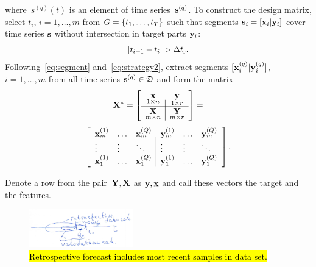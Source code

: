 \documentclass[conference]{IEEEtran}
\begin{document}
where~$s^{(q)}(t)$ is an element of time series~${\mathbf{s}}^{(q)}$. To construct the design matrix, select $t_i$, $i = 1, \dots, m$ from $G = \{t_1, \dots, t_T\}$ such that segments ${\mathbf{s}}_i = [{\mathbf{x}}_i|{\mathbf{y}}_i]$ cover time series ${\mathbf{s}}$
without intersection in target parts  ${\mathbf{y}}_i$:
\begin{equation}\label{eq:strategy2} |t_{i+1} - t_i| > \dtr.
\end{equation}
Following~\eqref{eq:segment} and~\eqref{eq:strategy2}, extract segments $[{\mathbf{x}}^{(q)}_i | {\mathbf{y}}^{(q)}_i]$, $i = 1, \dots, m$ from all time series ${\mathbf{s}}^{(q)} \in {\mathfrak{D}}$ and form the matrix
 \begin{equation}\label{eq:design_matrix}
\bX^*= \left[
\begin{array}{c|c}
\underset{1{\times}n}{\x} & \underset{1{\times}r}{{\by}}  \\
\hline
 \underset{m{\times}n}\bX & \underset{m{\times}r}\bY  \\
 \end{array}
\right] = \end{equation}
\[ \left[
\begin{array}{lll|lll}
{\mathbf{x}}_m^{(1)}  & \dots & {\mathbf{x}}_m^{(Q)} & {\mathbf{y}}_m^{(1)} &  \dots & {\mathbf{y}}_m^{(Q)}   \\
\vdots & \vdots & \ddots & \vdots & \vdots & \ddots  \\
{\mathbf{x}}_1^{(1)} & \dots & {\mathbf{x}}_1^{(Q)} & {\mathbf{y}}_1^{(1)}  & \dots & {\mathbf{y}}_1^{(Q)}   \\


\end{array}
\right]. \]

Denote a row from the pair~$\mathbf{Y},{\mathbf{X}}$ as ${\mathbf{y}},{\mathbf{x}}$ and call these vectors the target and the features.

\begin{figure}[!ht]
\centering\includegraphics[width=0.4\textwidth]{retrospective_validation.png}
\caption{\hl{Retrospective forecast includes most recent samples in data set.}\label{fg:retrospective}}
\end{figure}
\end{document}
